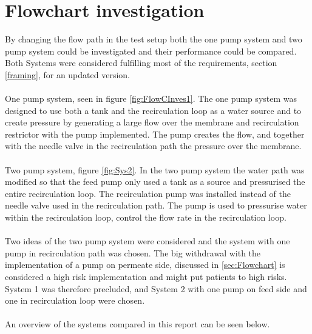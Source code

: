 \section{Flowchart investigation}
By changing the flow path in the test setup both the one pump system and two pump system could be investigated and their performance could be compared. Both Systems were considered fulfilling most of the requirements, section \ref{framing}, for an updated version. \\
\\
One pump system, seen in figure \ref{fig:FlowCInves1}. The one pump system was designed to use both a tank and the recirculation loop as a water source and to create pressure by generating a large flow over the membrane and recirculation restrictor with the pump implemented. The pump creates the flow, and together with the needle valve in the recirculation path the pressure over the membrane.  \\
\\
Two pump system, figure \ref{fig:Sys2}. In the two pump system the water path was modified so that the feed pump only used a tank as a source and pressurised the entire recirculation loop. The recirculation pump was installed instead of the needle valve used in the recirculation path. The pump is used to pressurise water within the recirculation loop, control the flow rate in the recirculation loop. \\
\\
Two ideas of the two pump system were considered and the system with one pump in recirculation path was chosen. The big withdrawal with the implementation of a pump on permeate side, discussed in \ref{sec:Flowchart} is considered a high risk implementation and might put patients to high risks. System 1 was therefore precluded, and System 2 with one pump on feed side and one in recirculation loop were chosen.\\
\\
An overview of the systems compared in this report can be seen below.\\
